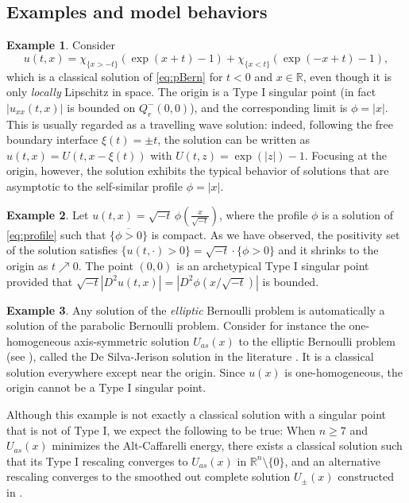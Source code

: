 \documentclass[11pt]{article}
\numberwithin{equation}{section}
\theoremstyle{definition}
\newtheorem{example}{Example}[section]
\newcommand{\RR}{\mathbb{R}}
\begin{document}
\subsection{Examples and model behaviors}

\begin{example}\label{eg:exp}
Consider
\[ u(t,x) = \chi_{\{x>-t\}} \left(\exp(x+t)-1 \right) + \chi_{\{x<t\}} \left(\exp(-x+t)-1 \right), \]
which is a classical solution of \eqref{eq:pBern} for $t<0$ and $x\in \RR$, even though it is only \emph{locally} Lipschitz in space. The origin is a Type I singular point (in fact $|u_{xx}(t,x)|$ is bounded on $Q_r^-(0,0)$), and the corresponding limit is $\phi=|x|$.
This is usually regarded as a travelling wave solution: indeed, following the free boundary interface $\xi(t)= \pm t$, the solution can be written as $u(t,x) = U(t,x-\xi(t))$ with $U(t,z) = \exp(|z|)-1$. Focusing at the origin, however, the solution exhibits the typical behavior of solutions that are asymptotic to the self-similar profile $\phi=|x|$.
\end{example}

\begin{example}
    Let $u(t,x) = \sqrt{-t}\,\phi \left( \frac{x}{\sqrt{-t}} \right)$, where the profile $\phi$ is a solution of \eqref{eq:profile} such that $\overline{\{\phi>0\}}$ is compact. As we have observed, the positivity set of the solution satisfies $\{u(t,\cdot)>0\} = \sqrt{-t} \cdot\{\phi>0\}$ and it shrinks to the origin as $t\nearrow 0$. The point $(0,0)$ is an archetypical Type I singular point provided that $\sqrt{-t}|D^2 u(t,x)| = |D^2 \phi(x/\sqrt{-t})|$ is bounded.
\end{example}


\begin{example} \label{eg:non-type-I}
    Any solution of the \emph{elliptic} Bernoulli problem is automatically a solution of the parabolic Bernoulli problem. Consider for instance the one-homogeneous axis-symmetric solution $U_{as}(x)$ to the elliptic Bernoulli problem (see \cite[Example 2.7]{AC}), called the De Silva-Jerison solution in the literature \cite{DSJ09}. It is a classical solution everywhere except near the origin. Since $u(x)$ is one-homogeneous, the origin cannot be a Type I singular point.
    
    Although this example is not exactly a classical solution with a singular point that is not of Type I, we expect the following to be true: When $n\geq 7$ and $U_{as}(x)$ minimizes the Alt-Caffarelli energy, there exists a classical solution such that its Type I rescaling converges to $U_{as}(x)$ in $\RR^n \setminus\{0\}$, and an alternative rescaling converges to the smoothed out complete solution $U_{\pm}(x)$ constructed in \cite{DSJS}. 
\end{example}
\end{document}

